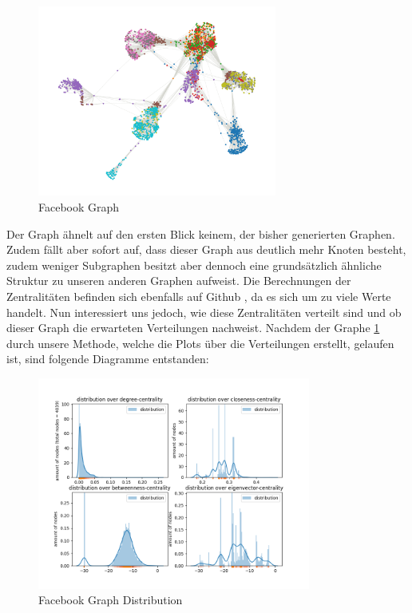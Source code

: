\FloatBarrier
\begin{figure}[h!]%
  \centering
 \includegraphics[width=0.7\textwidth]{Graphics/FacebookPoliticalPlot.png}
  \caption{Facebook Graph}
  \label{fig:FacebookGraph}
\end{figure}
\FloatBarrier



Der Graph ähnelt auf den ersten Blick keinem, der bisher generierten Graphen. Zudem fällt aber sofort auf, dass dieser Graph aus deutlich mehr Knoten besteht, zudem weniger Subgraphen besitzt aber dennoch eine grundsätzlich ähnliche Struktur zu unseren anderen Graphen aufweist. Die Berechnungen der Zentralitäten befinden sich ebenfalls auf Github \cite{TZ}, da es sich um zu viele Werte handelt. Nun interessiert uns jedoch, wie diese Zentralitäten verteilt sind und ob dieser Graph die erwarteten Verteilungen nachweist. Nachdem der Graphe \ref{fig:FacebookGraph} durch unsere Methode, welche die Plots über die Verteilungen erstellt, gelaufen ist, sind folgende Diagramme entstanden:

\FloatBarrier
\begin{figure}[h!]%
  \centering
\includegraphics[width=0.8\textwidth]{Graphics/facebookLOG.png}
  \caption{Facebook Graph Distribution}
  \label{fig:FacebookGraphDistribution}
\end{figure}
\FloatBarrier

